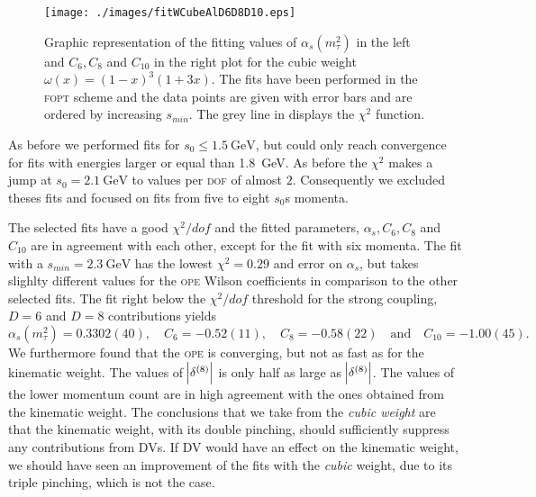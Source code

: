 \documentclass[../../index.tex]{subfiles}
\begin{document}
\begin{figure}
  \centering \texttt{[image: ./images/fitWCubeAlD6D8D10.eps]}
  \caption{Graphic representation of the fitting values of
    \(\alpha_s(m_\tau^2)\) in the left and \(C_6, C_8\) and \(C_{10}\) in the
    right plot for the cubic weight \(\omega(x)=(1-x)^3(1+3x)\). The fits have
    been performed in the \textsc{fopt} scheme and the data points are given
    with error bars and are ordered by increasing \(s_{min}\). The grey line in
    displays the \(\chi^2\) function.}
  \label{fig:fitWCubeAlpha}
\end{figure}

As before we performed fits for \(s_0 \leq \SI{1.5}{\giga\eV}\), but could only
reach convergence for fits with energies larger or equal than
\SI{1.8}{\giga\eV}. As before the \(\chi^2\) makes a jump at
\(s_0=\SI{2.1}{\giga\eV}\) to values per \textsc{dof} of almost \(2\).
Consequently we excluded theses fits and focused on fits from five to eight
\(s_0\)s momenta.

The selected fits have a good \(\chi^2/dof\) and the fitted parameters,
\(\alpha_s, C_6, C_8\) and \(C_{10}\) are in agreement with each other, except
for the fit with six momenta. The fit with a \(s_{min}=\SI{2.3}{\giga\eV}\) has
the lowest \(\chi^2=0.29\) and error on \(\alpha_s\), but takes slighlty
different values for the \textsc{ope} Wilson coefficients in comparison to the
other selected fits. The fit right below the \(\chi^2/dof\) threshold for the
strong coupling, \(D=6\) and \(D=8\) contributions yields
\begin{equation}
  \alpha_s(m_\tau^2)=0.3302(40), \quad C_6=-0.52(11), \quad C_8=-0.58(22) \quad \text{and} \quad C_{10}=-1.00(45).
\end{equation}
We furthermore found that the \textsc{ope} is converging, but not as fast as for
the kinematic weight. The values of \(\abs{\delta^{(8)}}\) is only half as large
as \(\abs{\delta^{(8)}}\). The values of the lower momentum count are in high
agreement with the ones obtained from the kinematic weight. The conclusions that
we take from the \textit{cubic weight} are that the kinematic weight, with its
double pinching, should sufficiently suppress any contributions from
\textsc{DV}s. If \textsc{DV} would have an effect on the kinematic weight, we
should have seen an improvement of the fits with the \textit{cubic} weight, due
to its triple pinching, which is not the case.
\end{document}
